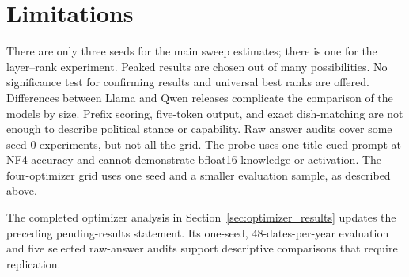 \section*{Limitations}
There are only three seeds for the main sweep estimates; there is one for the layer--rank experiment. Peaked results are chosen out of many possibilities. No significance test for confirming results and universal best ranks are offered. Differences between Llama and Qwen releases complicate the comparison of the models by size. Prefix scoring, five-token output, and exact dish-matching are not enough to describe political stance or capability. Raw answer audits cover some seed-0 experiments, but not all the grid. The probe uses one title-cued prompt at NF4 accuracy and cannot demonstrate bfloat16 knowledge or activation. The four-optimizer grid uses one seed and a smaller evaluation sample, as described above.

The completed optimizer analysis in Section~\ref{sec:optimizer_results} updates the preceding pending-results statement. Its one-seed, 48-dates-per-year evaluation and five selected raw-answer audits support descriptive comparisons that require replication.

